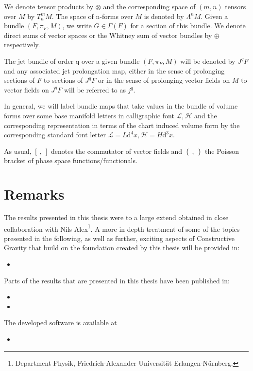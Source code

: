 We denote tensor products by $\otimes$ and the corresponding space of $(m,n)$ tensors over $M$ by $T^m_nM$. The space of n-forms over $M$ is denoted by $\Lambda^nM$. Given a bundle $(F,\pi_{F},M)$, we write $G \in \Gamma(F) $ for a section of this bundle. We denote direct sums of vector spaces or the Whitney sum of vector bundles by $\oplus$ respectively. 

The jet bundle of order q over a given bundle $(F,\pi_F,M)$ will be denoted by $J^qF$ and any associated jet prolongation map, either in the sense of prolonging sections of $F$ to sections of $J^qF$ or in the sense of prolonging vector fields on $M$ to vector fields on $J^qF$ will be referred to as $j^q$. 

In general, we will label bundle maps that take values in the bundle of volume forms over some base manifold letters in calligraphic font $\mathcal{L}, \mathcal{H}$ and the corresponding representation in terms of the chart induced volume form by the corresponding standard font letter $\mathcal{L}=L \mathrm{d}^4x, \mathcal{H}= H \mathrm{d}^3x$.

As usual, $\left[ \  ,   \  \right]$ denotes the commutator of vector fields and $\left \{  \  ,   \   \right \}$ the Poisson bracket of phase space functions/functionals. \\

\section*{Remarks}

The results presented in this thesis were to a large extend obtained in close collaboration with Nils Alex\footnote{Department Physik, Friedrich-Alexander Universität Erlangen-Nürnberg.}. 
A more in depth treatment of some of the topics presented in the following, as well as further, exciting aspects of Constructive Gravity that build on the foundation created by this thesis will be provided in:
\begin{itemize}
    \item {}
\end{itemize}
Parts of the results that are presented in this thesis have been published in:
\begin{itemize}
    \item {}
    \item {}
\end{itemize}
The developed software is available at
\begin{itemize}
    \item {}
\end{itemize}